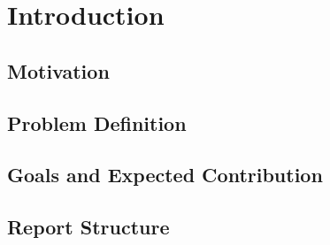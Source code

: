
%

\chapter{Introduction}
\label{cha:introduction}


\section{Motivation}
\label{sec:introduction}

\section{Problem Definition}
\label{sec:introduction}

\section{Goals and Expected Contribution}
\label{sec:introduction}

\section{Report Structure}
\label{sec:introduction}